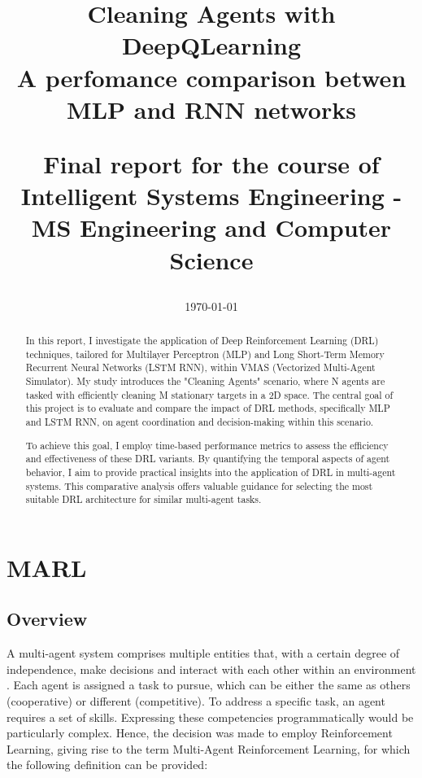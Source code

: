 \documentclass{scrartcl}
\title{Cleaning Agents with DeepQLearning
\\
A perfomance comparison betwen MLP and RNN networks
\\
\begin{small} 
  Final report for the course of Intelligent Systems Engineering  - 
  MS Engineering and Computer Science
\end{small}
}
\author{
    \emailaddr{filippo.cavallari2@studio.unibo.it}
}
\date{\today}
\begin{document}
\maketitle

\newpage

\begin{abstract}
  In this report, I investigate the application of Deep Reinforcement Learning (DRL) techniques, tailored for 
  Multilayer Perceptron (MLP) and Long Short-Term Memory Recurrent Neural Networks (LSTM RNN), within VMAS 
  (Vectorized Multi-Agent Simulator).
  My study introduces the "Cleaning Agents" scenario, where N agents are tasked with efficiently cleaning M 
  stationary targets in a 2D space. The central goal of this project is to evaluate and compare the impact of 
  DRL methods, specifically MLP and LSTM RNN, on agent coordination and decision-making within this scenario.
  
  To achieve this goal, I employ time-based performance metrics to assess the efficiency and effectiveness of 
  these DRL variants. By quantifying the temporal aspects of agent behavior, I aim to provide practical insights 
  into the application of DRL in multi-agent systems. This comparative analysis offers valuable guidance for selecting the 
  most suitable DRL architecture for similar multi-agent tasks.\end{abstract}
\newpage
\tableofcontents

\newpage
\listoffigures

\newpage

\section{MARL}

\subsection{Overview}
A multi-agent system comprises multiple entities that, with a certain degree of independence, make decisions 
and interact with each other within an environment \cite{weiss1999multiagent}. Each agent is assigned a task to pursue, which can be 
either the same as others (cooperative) or different (competitive). To address a specific task, an agent 
requires a set of skills. Expressing these competencies programmatically would be particularly complex. Hence, the decision was made to employ Reinforcement Learning, 
giving rise to the term Multi-Agent 
Reinforcement Learning, for which the following definition can be provided:
\end{document}
